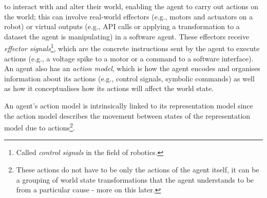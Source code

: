  to interact with and alter their world, enabling the agent to carry out actions on the world; this can involve real-world effectors (e.g., motors and actuators on a robot) or virtual outputs (e.g., API calls or applying a transformation to a dataset the agent is manipulating) in a software agent.
These effectors receive \emph{effector signals}\footnote{Called \emph{control signals} in the field of robotics.}, which are the concrete instructions sent by the agent to execute actions (e.g., a voltage spike to a motor or a command to a software interface).
An agent also has an \emph{action model}, which is how the agent encodes and organises information about its actions (e.g., control signals, symbolic commands) as well as how it conceptualises how its actions will affect the world state.

An agent's action model is intrinsically linked to its representation model since the action model describes the movement between states of the representation model due to actions\footnote{These actions do not have to be only the actions of the agent itself, it can be a grouping of world state transformations that the agent understands to be from a particular cause - more on this later.}.



